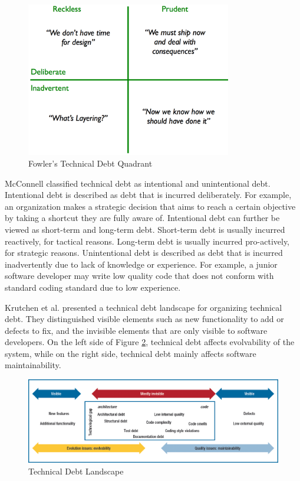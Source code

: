 \begin{figure}[ht!]
	\centering
	\includegraphics[width=0.8\textwidth]{images/techDebtQuadrant.png}
	\caption{Fowler's Technical Debt Quadrant}
	\label{fig:techDebtQuad}
\end{figure}

McConnell\cite{url-mcconnell} classified technical debt as intentional and unintentional debt. Intentional debt is described as debt that is incurred deliberately. For example, an organization makes a strategic decision that aims to reach a certain objective by taking a shortcut they are fully aware of. Intentional debt can further be viewed as short-term and long-term debt\cite{p8-codabux,mcconnel-slides}. Short-term debt is usually incurred reactively, for tactical reasons. Long-term debt is usually incurred pro-actively, for strategic reasons. Unintentional debt is described as debt that is incurred inadvertently due to lack of knowledge or experience. For example, a junior software developer may write low quality code that does not conform with standard coding standard due to low experience. 

Krutchen et al.\cite{krutchen} presented a technical debt landscape for organizing technical debt. They distinguished visible elements such as new functionality to add or defects to fix, and the invisible elements that are only visible to software developers. On the left side of Figure \ref{fig:techDebtLandscape}, technical debt affects evolvability of the system, while on the right side, technical debt mainly affects software maintainability. 

\begin{figure}[ht!]
	\centering
	\includegraphics[width=1.0\textwidth]{images/techDebtLandscape.png}
	\caption{Technical Debt Landscape}
	\label{fig:techDebtLandscape}
\end{figure}

